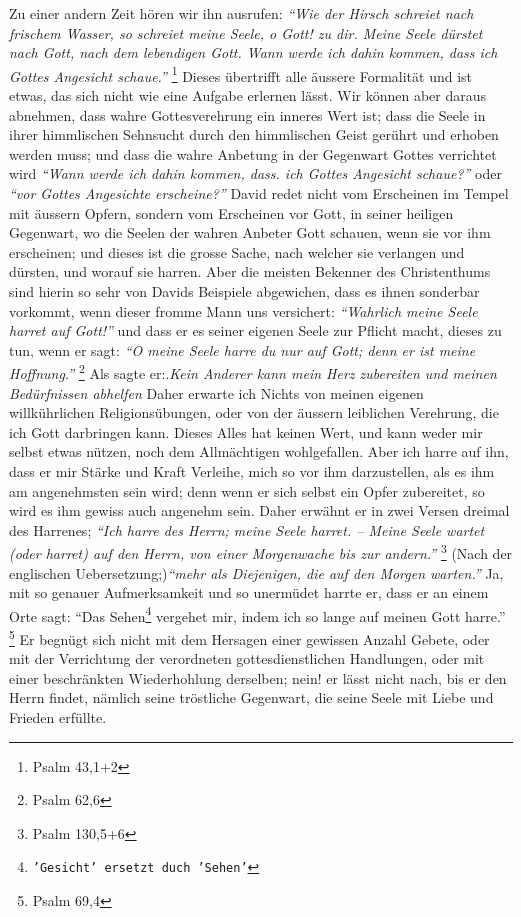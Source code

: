   Zu einer andern Zeit hören wir ihn
ausrufen:
\textit{"`Wie der Hirsch schreiet nach
frischem Wasser, so schreiet meine Seele, o Gott! zu dir. Meine Seele dürstet
nach Gott, nach dem lebendigen Gott. Wann werde ich dahin kommen, dass ich
Gottes Angesicht schaue."'}
\footnote{Psalm 43,1+2}
Dieses übertrifft alle äussere
Formalität  und ist etwas, das sich nicht wie eine
Aufgabe erlernen lässt. Wir
können aber daraus abnehmen, dass wahre Gottesverehrung ein inneres Wert ist;
dass die Seele in ihrer himmlischen Sehnsucht durch den himmlischen Geist
gerührt und erhoben werden muss; und dass die wahre Anbetung in der Gegenwart
Gottes verrichtet wird
\textit{"`Wann werde ich dahin kommen, dass. ich Gottes
Angesicht schaue?"'} oder \textit{"`vor Gottes Angesichte erscheine?"'} David
redet nicht
vom Erscheinen im Tempel  mit äussern Opfern, sondern
vom Erscheinen vor Gott, in
seiner heiligen Gegenwart, wo die Seelen der wahren Anbeter Gott schauen, wenn
sie vor ihm erscheinen; und dieses ist die grosse Sache, nach welcher sie
verlangen und dürsten, und worauf sie harren. Aber die meisten Bekenner des
Christenthums sind hierin so sehr von Davids Beispiele abgewichen, dass es ihnen
sonderbar vorkommt, wenn dieser fromme Mann uns versichert:
\textit{"`Wahrlich meine Seele harret auf Gott!"'}
und dass er es seiner eigenen Seele zur Pflicht macht,
dieses zu tun, wenn er sagt:
\textit{"`O meine Seele harre du nur auf Gott; denn er ist meine Hoffnung."'}
\footnote{Psalm 62,6}
Als sagte er:.\textit{Kein Anderer kann mein Herz
zubereiten und meinen Bedürfnissen abhelfen} Daher erwarte ich Nichts von meinen
eigenen willkührlichen Religionsübungen,
oder von der äussern leiblichen
Verehrung, die ich Gott darbringen kann. Dieses Alles hat keinen Wert, und kann
weder mir selbst etwas nützen, noch dem Allmächtigen wohlgefallen. Aber ich
harre auf ihn, dass er mir Stärke und Kraft Verleihe, mich so vor ihm
darzustellen, als es ihm am angenehmsten sein wird; denn wenn er sich selbst ein
Opfer  zubereitet, so wird es ihm gewiss auch angenehm
sein. Daher erwähnt er in
zwei Versen dreimal des Harrenes;
\textit{"`Ich harre des Herrn; meine Seele harret. --
Meine Seele wartet (oder harret) auf den Herrn, von einer Morgenwache bis zur
andern."'}
\footnote{Psalm 130,5+6}
(Nach der englischen Uebersetzung;)\textit{"`mehr als
Diejenigen, die auf den Morgen warten."'} Ja, mit so genauer Aufmerksamkeit und
so unermüdet harrte er, dass er an einem Orte sagt:
"`Das Sehen\footnote{\texttt{'Gesicht' ersetzt duch 'Sehen'}} vergehet mir,
indem ich so lange auf meinen Gott harre."'
\footnote{Psalm 69,4}
Er begnügt sich
nicht mit dem Hersagen einer gewissen Anzahl Gebete,
oder mit der Verrichtung
der verordneten gottesdienstlichen Handlungen, oder mit einer beschränkten
Wiederhohlung derselben; nein! er lässt nicht nach, bis er den Herrn findet,
nämlich seine tröstliche Gegenwart, die seine Seele mit Liebe und Frieden
erfüllte.


